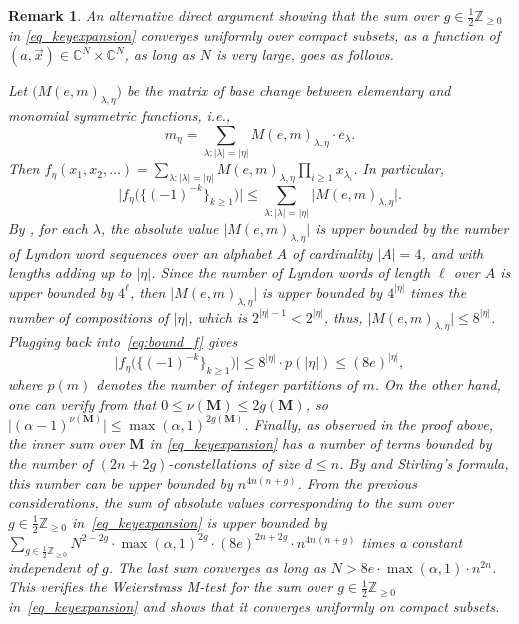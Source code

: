 \documentclass[11pt]{article}
\theoremstyle{plain}
\newtheorem{remark}[lemma]{Remark}
\newcommand{\Z}{\mathbb Z}
\newcommand{\C}{\mathbb C}
\newcommand{\la}{\lambda}
\newcommand{\MM}{\mathbf M}
\newcommand{\vecx}{\vec{x}}
\begin{document}
\begin{remark}
    An alternative direct argument showing that the sum over $g\in\frac{1}{2}\Z_{\ge 0}$ in \eqref{eq_keyexpansion} converges uniformly over compact subsets, as a function of $(a,\vecx)\in\C^N\times\C^N$, as long as $N$ is very large, goes as follows.
    
    Let $\big(M(e,m)_{\la,\eta}\big)$ be the matrix of base change between elementary and monomial symmetric functions, i.e.,
    \[
    m_\eta = \sum_{\la\colon |\la|=|\eta|}{ M(e,m)_{\la,\eta} \cdot e_\la }.
    \]
    Then $f_\eta(x_1,x_2,\dots)=\sum_{\la\colon |\la|=|\eta|}{ M(e,m)_{\la,\eta} \prod_{i\ge 1}{x_{\la_i}} }$. In particular,
    \begin{equation}\label{eq:bound_f}
    \bigg| f_{\eta}\Big(\big\{(-1)^{-k}\big\}_{k\ge 1}\Big) \bigg| \le \sum_{\la\colon |\la|=|\eta|}{ \Big| M(e,m)_{\la,\eta}\Big| }.
    \end{equation}
    By \cite[Theorem 1]{KR}, for each $\la$, the absolute value $\big| M(e,m)_{\la,\eta}\big|$ is upper bounded by the number of Lyndon word sequences over an alphabet $A$ of cardinality $|A|=4$, and with lengths adding up to $|\eta|$. Since the number of Lyndon words of length $\ell$ over $A$ is upper bounded by $4^{\ell}$, then $\big| M(e,m)_{\la,\eta}\big|$ is upper bounded by $4^{|\eta|}$ times the number of compositions of $|\eta|$, which is $2^{|\eta|-1}<2^{|\eta|}$, thus, $\big| M(e,m)_{\la,\eta}\big|\le 8^{|\eta|}$. Plugging back into~\eqref{eq:bound_f} gives
    \[
    \bigg| f_{\eta}\Big(\big\{(-1)^{-k}\big\}_{k\ge 1}\Big) \bigg| \le 8^{|\eta|}\cdot p(|\eta|) \le (8e)^{|\eta|},
    \]
    where $p(m)$ denotes the number of integer partitions of $m$.
    On the other hand, one can verify from \cite[Definitions 3.6\,--\,3.8]{CD} that $0\le\nu(\MM)\le 2g(\MM)$, so $\big|(\alpha-1)^{\nu(\MM)}\big|\le \max(\alpha,1)^{2g(\MM)}$.
    Finally, as observed in the proof above, the inner sum over $\MM$ in \eqref{eq_keyexpansion} has a number of terms bounded by the number of $(2n+2g)$-constellations of size $d\le n$.
    By \cite[Theorem 3.1]{BD} and Stirling's formula, this number can be upper bounded by $n^{4n(n+g)}$.
    From the previous considerations, the sum of absolute values corresponding to the sum over $g\in\frac{1}{2}\Z_{\ge 0}$ in~\eqref{eq_keyexpansion} is upper bounded by $\sum_{g\in\frac{1}{2}\Z_{\ge 0}}{N^{2-2g}\cdot \max(\alpha,1)^{2g}\cdot (8e)^{2n+2g}\cdot n^{4n(n+g)}}$ times a constant independent of $g$.
    The last sum converges as long as $N>8e\cdot\max(\alpha,1)\cdot n^{2n}$.
    This verifies the Weierstrass M-test for the sum over $g\in\frac{1}{2}\Z_{\ge 0}$ in~\eqref{eq_keyexpansion} and shows that it converges uniformly on compact subsets.
\end{remark}
\end{document}

